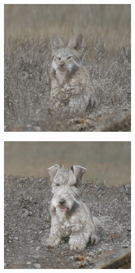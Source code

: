 \documentclass{article}
\begin{document}
\begin{figure}
    \begin{subfigure}[b]{0.19\linewidth}
    \includegraphics[width=\linewidth]{figures/imagenet256/solver_samples/imagenet256_fm_ot_14_05.png}
    \end{subfigure}
    \begin{subfigure}[b]{0.19\linewidth}
    \includegraphics[width=\linewidth]{figures/imagenet256/solver_samples/imagenet256_fm_ot_14_10.png}

\end{subfigure}
\end{figure}
\end{document}
